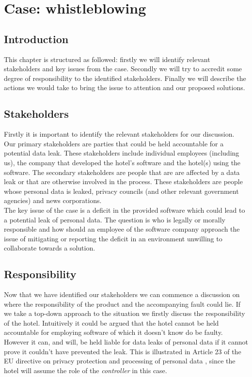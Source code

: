 \chapter{Case: whistleblowing}
\section{Introduction}
This chapter is structured as followed: firstly we will identify relevant stakeholders and key issues from the case. Secondly we will try to accredit some degree of responsibility to the identified stakeholders. Finally we will describe the actions we would take to bring the issue to attention and our proposed solutions.

\section{Stakeholders}
Firstly it is important to identify the relevant stakeholders for our discussion. Our primary stakeholders are parties that could be held accountable for a potential data leak. These stakeholders include individual employees (including us), the company that developed the hotel's software and the hotel(s) using the software.  The secondary stakeholders are people that are are affected by a data leak or that are otherwise involved in the process. These stakeholders are people whose personal data is leaked, privacy councils (and other relevant government agencies) and news corporations.\\
The key issue of the case is a deficit in the provided software which could lead to a potential leak of personal data. The question is who is legally or morally responsible and how should an employee of the software company approach the issue of mitigating or reporting the deficit in an environment unwilling to collaborate towards a solution.

\section{Responsibility}
Now that we have identified our stakeholders we can commence a discussion on where the responsibility of the product and the accompanying fault could lie. If we take a top-down approach to the situation we firstly discuss the responsibility of the hotel. Intuitively it could be argued that the hotel cannot be held accountable for employing software of which it doesn't know do be faulty. However it can, and will, be held liable for data leaks of personal data if it cannot prove it couldn't have prevented the leak. This is illustrated in Article 23 of the EU directive on privacy protection and processing of personal data \cite{privacy_directive}, since the hotel will assume the role of the \textit{controller} in this case.

